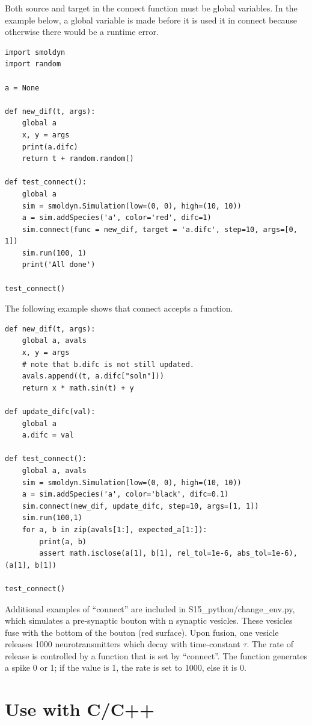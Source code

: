 \documentclass {scrbook}
\begin{document}
Both source and target in the connect function must be global variables. In the example below, a global variable is made before it is used it in connect because otherwise there would be a runtime error.

\begin{lstlisting}[style=SSAPython]
import smoldyn
import random

a = None

def new_dif(t, args):
    global a
    x, y = args
    print(a.difc)
    return t + random.random()

def test_connect():
    global a
    sim = smoldyn.Simulation(low=(0, 0), high=(10, 10))
    a = sim.addSpecies('a', color='red', difc=1)
    sim.connect(func = new_dif, target = 'a.difc', step=10, args=[0, 1])
    sim.run(100, 1)
    print('All done')

test_connect()
\end{lstlisting}

The following example shows that connect accepts a function.

\begin{lstlisting}[style=SSAPython]
def new_dif(t, args):
    global a, avals
    x, y = args
    # note that b.difc is not still updated.
    avals.append((t, a.difc["soln"]))
    return x * math.sin(t) + y

def update_difc(val):
    global a
    a.difc = val

def test_connect():
    global a, avals
    sim = smoldyn.Simulation(low=(0, 0), high=(10, 10))
    a = sim.addSpecies('a', color='black', difc=0.1)
    sim.connect(new_dif, update_difc, step=10, args=[1, 1])
    sim.run(100,1)
    for a, b in zip(avals[1:], expected_a[1:]):
        print(a, b)
        assert math.isclose(a[1], b[1], rel_tol=1e-6, abs_tol=1e-6), (a[1], b[1])

test_connect()
\end{lstlisting}

Additional examples of ``connect'' are included in S15\_python/change\_env.py, which simulates a pre-synaptic bouton with n synaptic vesicles. These vesicles fuse with the bottom of the bouton (red surface). Upon fusion, one vesicle releases 1000 neurotransmitters which decay with time-constant $\tau$. The rate of release is controlled by a function that is set by ``connect''. The function generates a spike 0 or 1; if the value is 1, the rate is set to 1000, else it is 0.


\section{Use with C/C++}
\end{document}
